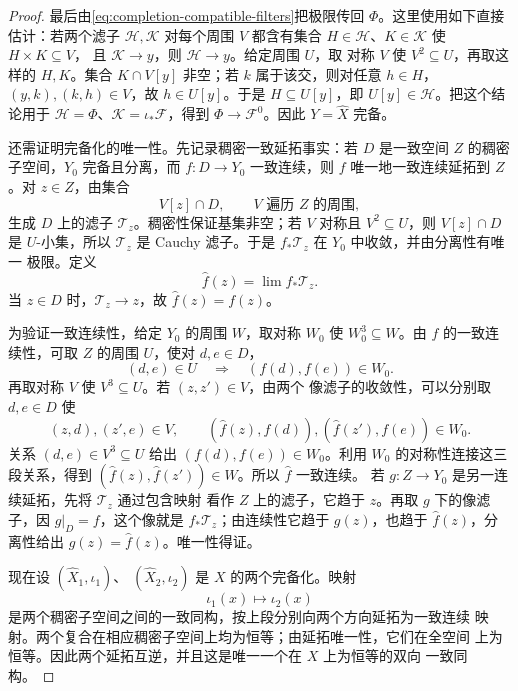 \begin{proof}
最后由\eqref{eq:completion-compatible-filters}把极限传回 \(\Phi\)。这里使用如下直接估计：若两个滤子
\(\mathcal H,\mathcal K\) 对每个周围 \(V\) 都含有集合
\(H\in\mathcal H\)、\(K\in\mathcal K\) 使 \(H\times K\subseteq V\)，
且 \(\mathcal K\to y\)，则 \(\mathcal H\to y\)。给定周围 \(U\)，取
对称 \(V\) 使 \(V^2\subseteq U\)，再取这样的 \(H,K\)。集合
\(K\cap V[y]\) 非空；若 \(k\) 属于该交，则对任意 \(h\in H\)，
\((y,k),(k,h)\in V\)，故 \(h\in U[y]\)。于是
\(H\subseteq U[y]\)，即 \(U[y]\in\mathcal H\)。把这个结论用于
\(\mathcal H=\Phi\)、\(\mathcal K=\iota_*\mathcal F\)，得到
\(\Phi\to\mathcal F^0\)。因此 \(Y=\widehat X\) 完备。

还需证明完备化的唯一性。先记录稠密一致延拓事实：若 \(D\) 是一致空间
\(Z\) 的稠密子空间，\(Y_0\) 完备且分离，而
\(f:D\to Y_0\) 一致连续，则 \(f\) 唯一地一致连续延拓到 \(Z\)。对
\(z\in Z\)，由集合
\[
 V[z]\cap D,\qquad V\text{ 遍历 }Z\text{ 的周围},
\]
生成 \(D\) 上的滤子 \(\mathcal T_z\)。稠密性保证基集非空；若
\(V\) 对称且 \(V^2\subseteq U\)，则
\(V[z]\cap D\) 是 \(U\)-小集，所以 \(\mathcal T_z\) 是 Cauchy
滤子。于是 \(f_*\mathcal T_z\) 在 \(Y_0\) 中收敛，并由分离性有唯一
极限。定义
\[
 \widehat f(z)=\lim f_*\mathcal T_z.
\]
当 \(z\in D\) 时，\(\mathcal T_z\to z\)，故
\(\widehat f(z)=f(z)\)。

为验证一致连续性，给定 \(Y_0\) 的周围 \(W\)，取对称 \(W_0\) 使
\(W_0^3\subseteq W\)。由 \(f\) 的一致连续性，可取 \(Z\) 的周围
\(U\)，使对 \(d,e\in D\)，
\[
 (d,e)\in U\quad\Longrightarrow\quad(f(d),f(e))\in W_0.
\]
再取对称 \(V\) 使 \(V^3\subseteq U\)。若 \((z,z')\in V\)，由两个
像滤子的收敛性，可以分别取 \(d,e\in D\) 使
\[
 (z,d),(z',e)\in V,\qquad
 (\widehat f(z),f(d)),(\widehat f(z'),f(e))\in W_0.
\]
关系 \((d,e)\in V^3\subseteq U\) 给出
\((f(d),f(e))\in W_0\)。利用 \(W_0\) 的对称性连接这三段关系，得到
\((\widehat f(z),\widehat f(z'))\in W\)。所以 \(\widehat f\) 一致连续。
若 \(g:Z\to Y_0\) 是另一连续延拓，先将 \(\mathcal T_z\) 通过包含映射
看作 \(Z\) 上的滤子，它趋于 \(z\)。再取 \(g\) 下的像滤子，因
\(g|_D=f\)，这个像就是 \(f_*\mathcal T_z\)；由连续性它趋于 \(g(z)\)，也趋于
\(\widehat f(z)\)，分离性给出 \(g(z)=\widehat f(z)\)。唯一性得证。

现在设 \((\widehat X_1,\iota_1)\)、
\((\widehat X_2,\iota_2)\) 是 \(X\) 的两个完备化。映射
\[
 \iota_1(x)\longmapsto\iota_2(x)
\]
是两个稠密子空间之间的一致同构，按上段分别向两个方向延拓为一致连续
映射。两个复合在相应稠密子空间上均为恒等；由延拓唯一性，它们在全空间
上为恒等。因此两个延拓互逆，并且这是唯一一个在 \(X\) 上为恒等的双向
一致同构。
\end{proof}

